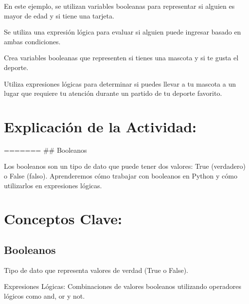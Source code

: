 \documentclass[
  a4paper,
  onepage,
  openany]{scrreprt}
\begin{document}
En este ejemplo, se utilizan variables booleanas para representar si
alguien es mayor de edad y si tiene una tarjeta.

Se utiliza una expresión lógica para evaluar si alguien puede ingresar
basado en ambas condiciones.

\begin{tcolorbox}[enhanced jigsaw, breakable, opacityback=0, toptitle=1mm, coltitle=black, toprule=.15mm, rightrule=.15mm, colframe=quarto-callout-important-color-frame, opacitybacktitle=0.6, arc=.35mm, title=\textcolor{quarto-callout-important-color}{\faExclamation}\hspace{0.5em}{Actividad Práctica:}, titlerule=0mm, colbacktitle=quarto-callout-important-color!10!white, bottomtitle=1mm, bottomrule=.15mm, colback=white, left=2mm, leftrule=.75mm]

Crea variables booleanas que representen si tienes una mascota y si te
gusta el deporte.

Utiliza expresiones lógicas para determinar si puedes llevar a tu
mascota a un lugar que requiere tu atención durante un partido de tu
deporte favorito.

\end{tcolorbox}

\hypertarget{explicaciuxf3n-de-la-actividad-24}{%
\section{Explicación de la
Actividad:}\label{explicaciuxf3n-de-la-actividad-24}}

======= \#\# Booleanos

Los booleanos son un tipo de dato que puede tener dos valores: True
(verdadero) o False (falso). Aprenderemos cómo trabajar con booleanos en
Python y cómo utilizarlos en expresiones lógicas.

\hypertarget{conceptos-clave-27}{%
\section{Conceptos Clave:}\label{conceptos-clave-27}}

\hypertarget{booleanos-2}{%
\subsection{Booleanos}\label{booleanos-2}}

Tipo de dato que representa valores de verdad (True o False).

Expresiones Lógicas: Combinaciones de valores booleanos utilizando
operadores lógicos como and, or y not.
\end{document}
